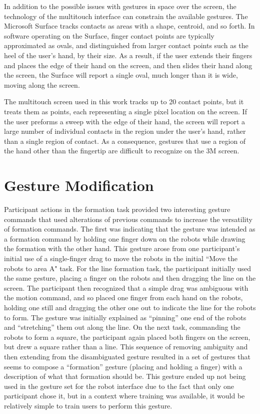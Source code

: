 In addition to the possible issues with gestures in space over the screen, the technology of the multitouch interface can constrain the available gestures. 
The Microsoft Surface tracks contacts as areas with a shape, centroid, and so forth. 
In software operating on the Surface, finger contact points are typically approximated as ovals, and distinguished from larger contact points such as the heel of the user's hand, by their size. 
As a result, if the user extends their fingers and places the edge of their hand on the screen, and then slides their hand along the screen, the Surface will report a single oval, much longer than it is wide, moving along the screen. 

The multitouch screen used in this work tracks up to 20 contact points, but it treats them as points, each representing a single pixel location on the screen. 
If the user preforms a sweep with the edge of their hand, the screen will report a large number of individual contacts in the region under the user's hand, rather than a single region of contact.
As a consequence, gestures that use a region of the hand other than the fingertip are difficult to recognize on the 3M screen. 

\section{Gesture Modification}

Participant actions in the formation task provided two interesting gesture commands that used alterations of previous commands to increase the versatility of formation commands. 
The first was indicating that the gesture was intended as a formation command by holding one finger down on the robots while drawing the formation with the other hand. 
This gesture arose from one participant's initial use of a single-finger drag to move the robots in the initial ``Move the robots to area A" task. 
For the line formation task, the participant initially used the same gesture, placing a finger on the robots and then dragging the line on the screen. 
The participant then recognized that a simple drag was ambiguous with the motion command, and so placed one finger from each hand on the robots, holding one still and dragging the other one out to indicate the line for the robots to form. 
The gesture was initially explained as ``pinning'' one end of the robots and ``stretching'' them out along the line.
On the next task, commanding the robots to form a square, the participant again placed both fingers on the screen, but drew a square rather than a line. 
This sequence of removing ambiguity and then extending from the disambiguated gesture resulted in a set of gestures that seems to compose a ``formation'' gesture (placing and holding a finger) with a description of what that formation should be. 
This gesture ended up not being used in the gesture set for the robot interface due to the fact that only one participant chose it, but in a context where training was available, it would be relatively simple to train users to perform this gesture. 

